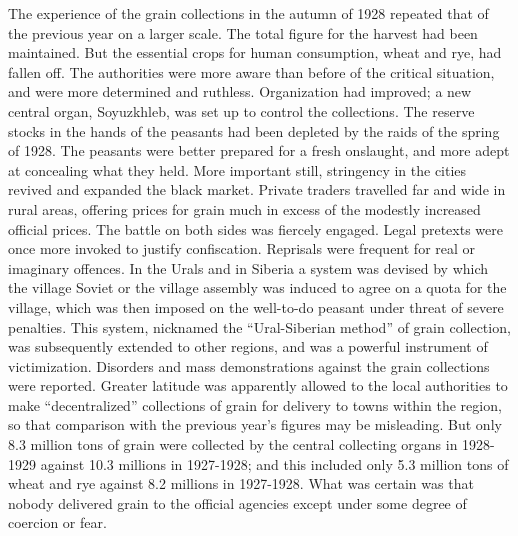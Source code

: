 The experience of the grain collections in the autumn of 1928 repeated that of the previous year on a larger scale. The total figure for the harvest had been maintained. But the essential crops for human consumption, wheat and rye, had fallen off. The authorities were more aware than before of the critical situation, and were more determined and ruthless. Organization had improved; a new central organ, Soyuzkhleb, was set up to control the collections. The reserve stocks in the hands of the peasants had been depleted by the raids of the spring of 1928. The peasants were better prepared for a fresh onslaught, and more adept at concealing what they held. More important still, stringency in the cities revived and expanded the black market. Private traders travelled far and wide in rural areas, offering prices for grain much in excess of the modestly increased official prices. The battle on both sides was fiercely engaged. Legal pretexts were once more invoked to justify confiscation. Reprisals were frequent for real or imaginary offences. In the Urals and in Siberia a system was devised by which the village Soviet or the village assembly was induced to agree on a quota for the village, which was then imposed on the well-to-do peasant under threat of severe penalties. This system, nicknamed the ``Ural-Siberian method'' of grain collection, was subsequently extended to other regions, and was a powerful instrument of victimization. Disorders and mass demonstrations against the grain collections were reported. Greater latitude was apparently allowed to the local authorities to make ``decentralized'' collections of grain for delivery to towns within the region, so that comparison with the previous year's figures may be misleading. But only 8.3 million tons of grain were collected by the central collecting organs in 1928-1929 against 10.3 millions in 1927-1928; and this included only 5.3 million tons of wheat and rye against 8.2 millions in 1927-1928. What was certain was that nobody delivered grain to the official agencies except under some degree of coercion or fear. 

